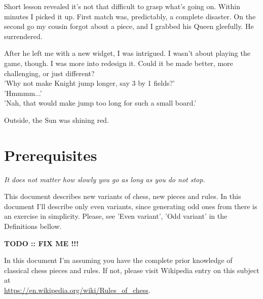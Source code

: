 \documentclass[a5paper,12pt,draft]{book} %
\begin{document}
Short lesson revealed it's not that difficult to grasp what's going
on. Within minutes I picked it up. First match was, predictably, a
complete disaster. On the second go my cousin forgot about a piece,
and I grabbed his Queen gleefully. He surrendered.

After he left me with a new widget, I was intrigued. I wasn't
about playing the game, though. I was more into redesign it. Could it
be made better, more challenging, or just different? \\
'Why not make Knight jump longer, say 3 by 1 fields?' \\
'Hmmmm...' \\
'Nah, that would make jump too long for such a small board.'

Outside, the Sun was shining red.
\clearpage

\chapter*{Prerequisites}

\begin{flushright}
\parbox{0.7\textwidth}{
\emph{It does not matter how slowly you go as long as you do not stop. \\
 } }
\end{flushright}

\noindent
This document describes new variants of chess, new pieces
and rules. In this document I'll describe only even variants, since
generating odd ones from there is an exercise in simplicity. Please,
see 'Even variant', 'Odd variant' in the Definitions bellow.

\textbf{\huge{TODO :: FIX ME !!!}} %

In this document I'm assuming you have the complete prior
knowledge of classical chess pieces and rules. If not, please visit
Wikipedia entry on this subject at \\
\href{https://en.wikipedia.org/wiki/Rules\_of\_chess}{https://en.wikipedia.org/wiki/Rules\_of\_chess}.
\clearpage

\end{document}
